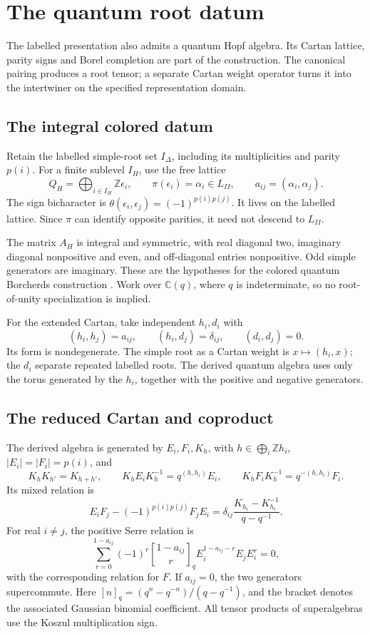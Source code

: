 \chapter{The quantum root datum}
\label{comp:ch:quantum-roots}

The labelled presentation also admits a quantum Hopf algebra.
Its Cartan lattice, parity signs and Borel completion are part of
the construction. The canonical pairing produces a root tensor;
a separate Cartan weight operator turns it into the intertwiner
on the specified representation domain.

\section{The integral colored datum}
Retain the labelled simple-root set \(I_\Delta\), including its
multiplicities and parity \(p(i)\). For a finite sublevel
\(I_H\), use the free lattice
\[
 Q_H=\bigoplus_{i\in I_H}\mathbb Z\epsilon_i,
 \qquad \pi(\epsilon_i)=\alpha_i\in L_{II},
 \qquad a_{ij}=(\alpha_i,\alpha_j).
\]
The sign bicharacter is
\(\theta(\epsilon_i,\epsilon_j)=(-1)^{p(i)p(j)}\).
It lives on the labelled lattice. Since \(\pi\) can identify
opposite parities, it need not descend to \(L_{II}\).

The matrix \(A_H\) is integral and symmetric, with real diagonal
two, imaginary diagonal nonpositive and even, and off-diagonal
entries nonpositive. Odd simple generators are imaginary. These
are the hypotheses for the colored quantum Borcherds construction
\cite[Section~2]{Hong98}. Work over \(\mathbb C(q)\), where
\(q\) is indeterminate, so no root-of-unity specialization is implied.

For the extended Cartan, take independent \(h_i,d_i\) with
\[
 (h_i,h_j)=a_{ij},\qquad(h_i,d_j)=\delta_{ij},
 \qquad(d_i,d_j)=0.
\]
Its form is nondegenerate. The simple root as a Cartan weight is
\(x\mapsto(h_i,x)\); the \(d_i\) separate repeated labelled
roots. The derived quantum algebra uses only the torus generated
by the \(h_i\), together with the positive and negative generators.

\section{The reduced Cartan and coproduct}
The derived algebra is generated by \(E_i,F_i,K_h\), with
\(h\in\bigoplus_i\mathbb Zh_i\), \(|E_i|=|F_i|=p(i)\), and
\[
 K_hK_{h'}=K_{h+h'},\qquad
 K_hE_iK_h^{-1}=q^{(h,h_i)}E_i,\qquad
 K_hF_iK_h^{-1}=q^{-(h,h_i)}F_i.
\]
Its mixed relation is
\[
 E_iF_j-(-1)^{p(i)p(j)}F_jE_i
 =\delta_{ij}\frac{K_{h_i}-K_{h_i}^{-1}}{q-q^{-1}}.
\]
For real \(i\ne j\), the positive Serre relation is
\[
 \sum_{r=0}^{1-a_{ij}}(-1)^r
 {1-a_{ij}\brack r}_q E_i^{1-a_{ij}-r}E_jE_i^r=0,
\]
with the corresponding relation for \(F\). If \(a_{ij}=0\),
the two generators supercommute. Here
\([n]_q=(q^n-q^{-n})/(q-q^{-1})\), and the bracket denotes
the associated Gaussian binomial coefficient. All tensor products
of superalgebras use the Koszul multiplication sign.

